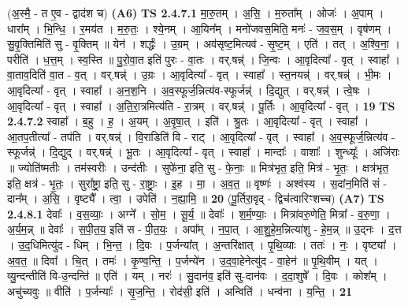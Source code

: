 \documentclass[17pt]{extarticle}
\begin{document}
                  \newline
                      (अ॒स्मै॒ - त ए॒व - द्वाद॑श च)  \textbf{(A6)} \newline \newline
                                \textbf{ TS 2.4.7.1} \newline
                  मा॒रु॒तम् । अ॒सि॒ । म॒रुता᳚म् । ओजः॑ । अ॒पाम् । धारा᳚म् । भि॒न्धि॒ । र॒मय॑त । म॒रु॒तः॒ । श्ये॒नम् । आ॒यिन᳚म् । मनो॑जवस॒मिति॒ मनः॑ - ज॒व॒स॒म् । वृष॑णम् । सु॒वृ॒क्तिमिति॑ सु - वृ॒क्तिम् ॥ येन॑ । शर्द्धः॑ । उ॒ग्रम् । अव॑सृष्ट॒मित्यव॑ - सृ॒ष्ट॒म् । एति॑ । तत् । अ॒श्वि॒ना॒ । परीति॑ । ध॒त्त॒म् । स्व॒स्ति ॥ पु॒रो॒वा॒त इति॑ पुरः - वा॒तः । वर्.षन्न्॑ । जि॒न्वः । आ॒वृदित्या᳚ - वृत् । स्वाहा᳚ । वा॒ताव॒दिति॑ वा॒त - व॒त् । वर्.षन्न्॑ । उ॒ग्रः । आ॒वृदित्या᳚ - वृत् । स्वाहा᳚ । स्त॒नयन्न्॑ । वर्.षन्न्॑ । भी॒मः । आ॒वृदित्या᳚ - वृत् । स्वाहा᳚ । अ॒न॒श॒नि । अ॒व॒स्फूर्ज॒न्नित्य॑व-स्फूर्जन्न्॑ । दि॒द्युत् । वर्.षन्न्॑ । त्वे॒षः । आ॒वृदित्या᳚ - वृत् । स्वाहा᳚ । अ॒ति॒रा॒त्रमित्य॑ति - रा॒त्रम् । वर्.षन्न्॑ । पू॒र्तिः । आ॒वृदित्या᳚ - वृत् । \textbf{  19} \newline
                  \newline
                                \textbf{ TS 2.4.7.2} \newline
                  स्वाहा᳚ । ब॒हु । ह॒ । अ॒यम् । अ॒वृ॒षा॒त् । इति॑ । श्रु॒तः । आ॒वृदित्या᳚ - वृत् । स्वाहा᳚ । आ॒तप॒तीत्या᳚ - तप॑ति । वर्.षन्न्॑ । वि॒राडिति॑ वि - राट् । आ॒वृदित्या᳚ - वृत् । स्वाहा᳚ । अ॒व॒स्फूर्ज॒न्नित्य॑व - स्फूर्जन्न्॑ । दि॒द्युद् । वर्.षन्न्॑ । भू॒तः । आ॒वृदित्या᳚ - वृत् । स्वाहा᳚ । मान्दाः᳚ । वाशाः᳚ । शुन्ध्यूः᳚ । अजि॑राः ॥ ज्योति॑ष्मतीः । तम॑स्वरीः । उन्द॑तीः । सुफे॑ना॒ इति॒ सु - फे॒नाः॒ ॥ मित्र॑भृत॒ इति॒ मित्र॑ - भृ॒तः॒ । क्षत्र॑भृत॒ इति॒ क्षत्र॑ - भृ॒तः॒ । सुरा᳚ष्ट्रा॒ इति॒ सु - रा॒ष्ट्राः॒ । इ॒ह । मा॒ । अ॒व॒त॒ ॥ वृष्णः॑ । अश्व॑स्य । स॒दांन॒मिति॑ सं - दान᳚म् । अ॒सि॒ । वृष्ट्यै᳚ । त्वा॒ । उपेति॑ । न॒ह्या॒मि॒ ॥ \textbf{  20} \newline
                  \newline
                      (पू॒र्तिरा॒वृद् - द्विच॑त्वारिꣳशच्च)  \textbf{(A7)} \newline \newline
                                \textbf{ TS 2.4.8.1} \newline
                  देवाः᳚ । व॒स॒व्याः॒ । अग्ने᳚ । सो॒म॒ । सू॒र्य॒ ॥ देवाः᳚ । श॒र्म॒ण्याः॒ । मित्रा॑वरु॒णेति॒ मित्रा᳚ - व॒रु॒णा॒ । अ॒र्य॒म॒न्न् ॥ देवाः᳚ । स॒पी॒त॒य॒ इति॑ स - पी॒त॒यः॒ । अपा᳚म् । न॒पा॒त् । आ॒शु॒हे॒म॒न्नित्या॑शु - हे॒म॒न्न् ॥ उ॒द्नः । द॒त्त । उ॒द॒धिमित्यु॑द - धिम् । भि॒न्त॒ । दि॒वः ।   प॒र्जन्या᳚त् । अ॒न्तरि॑क्षात् । पृ॒थि॒व्याः । ततः॑ । नः॒ । वृष्ट्या᳚ । अ॒व॒त॒ ॥ दिवा᳚ । चि॒त् । तमः॑ । कृ॒ण्व॒न्ति॒ । प॒र्जन्ये॑न । उ॒द॒वा॒हेनेत्यु॑द - वा॒हेन॑ ॥ पृ॒थि॒वीम् । यत् । व्यु॒न्दन्तीति॑ वि-उ॒न्दन्ति॑ ॥ एति॑ । यम् । नरः॑ । सु॒दान॑व॒ इति॑ सु-दान॑वः । द॒दा॒शुषे᳚ । दि॒वः । कोश᳚म् । अचु॑च्यवुः ॥ वीति॑ । प॒र्जन्याः᳚ । सृ॒ज॒न्ति॒ । रोद॑सी॒ इति॑ । अन्विति॑ । धन्व॑ना । य॒न्ति॒ । \textbf{  21} \newline
\end{document}

